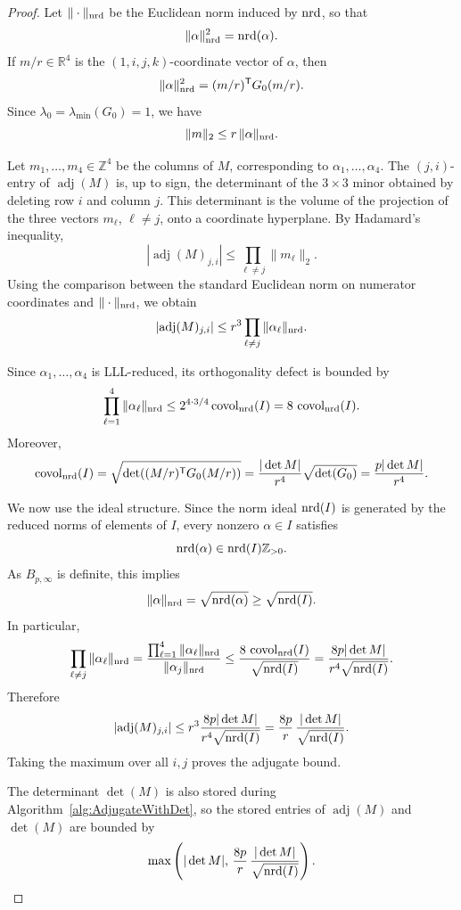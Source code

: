 \begin{proof}
Let \(\|\cdot\|_{\mathrm{nrd}}\) be the Euclidean norm induced by \(\mathrm{nrd}\), so that
\[
  \|\alpha\|_{\mathrm{nrd}}^2=\mathrm{nrd}(\alpha).
\]
If \(m/r\in\mathbb R^4\) is the \((1,i,j,k)\)-coordinate vector of \(\alpha\), then
\[
  \|\alpha\|_{\mathrm{nrd}}^2
  =
  (m/r)^{\mathsf T}G_0(m/r).
\]
Since \(\lambda_0=\lambda_{\min}(G_0)=1\), we have
\[
  \|m\|_2
  \le
  r\,\|\alpha\|_{\mathrm{nrd}}.
\]

Let \(m_1,\ldots,m_4\in\mathbb Z^4\) be the columns of \(M\), corresponding to
\(\alpha_1,\ldots,\alpha_4\).  The \((j,i)\)-entry of
\(\operatorname{adj}(M)\) is, up to sign, the determinant of the \(3\times 3\)
minor obtained by deleting row \(i\) and column \(j\).  This determinant is the
volume of the projection of the three vectors \(m_\ell\), \(\ell\neq j\), onto a
coordinate hyperplane.  By Hadamard's inequality,
\[
  \left|\operatorname{adj}(M)_{j,i}\right|
  \le
  \prod_{\ell\neq j}\|m_\ell\|_2 .
\]
Using the comparison between the standard Euclidean norm on numerator
coordinates and \(\|\cdot\|_{\mathrm{nrd}}\), we obtain
\[
  \left|\operatorname{adj}(M)_{j,i}\right|
  \le
  r^3
  \prod_{\ell\neq j}\|\alpha_\ell\|_{\mathrm{nrd}}.
\]

Since \(\alpha_1,\ldots,\alpha_4\) is LLL-reduced, its orthogonality
defect is bounded by
\[
  \prod_{\ell=1}^4 \|\alpha_\ell\|_{\mathrm{nrd}}
  \le
  2^{4\cdot 3/4}\operatorname{covol}_{\mathrm{nrd}}(I)
  =
  8\,\operatorname{covol}_{\mathrm{nrd}}(I).
\]
Moreover,
\[
  \operatorname{covol}_{\mathrm{nrd}}(I)
  =
  \sqrt{\det\!\left((M/r)^{\mathsf T}G_0(M/r)\right)}
  =
  \frac{|\det M|}{r^4}\sqrt{\det(G_0)}
  =
  \frac{p|\det M|}{r^4}.
\]

We now use the ideal structure.  Since the norm ideal \(\mathrm{nrd}(I)\) is generated by
the reduced norms of elements of \(I\), every nonzero \(\alpha\in I\) satisfies
\[
  \mathrm{nrd}(\alpha)\in \mathrm{nrd}(I)\mathbb Z_{>0}.
\]
As \(B_{p,\infty}\) is definite, this implies
\[
  \|\alpha\|_{\mathrm{nrd}}
  =
  \sqrt{\mathrm{nrd}(\alpha)}
  \ge
  \sqrt{\mathrm{nrd}(I)}.
\]
In particular,
\[
  \prod_{\ell\neq j}\|\alpha_\ell\|_{\mathrm{nrd}}
  =
  \frac{\prod_{\ell=1}^4\|\alpha_\ell\|_{\mathrm{nrd}}}
       {\|\alpha_j\|_{\mathrm{nrd}}}
  \le
  \frac{8\,\operatorname{covol}_{\mathrm{nrd}}(I)}{\sqrt{\mathrm{nrd}(I)}}
  =
  \frac{8p|\det M|}{r^4\sqrt{\mathrm{nrd}(I)}}.
\]
Therefore
\[
  \left|\operatorname{adj}(M)_{j,i}\right|
  \le
  r^3
  \frac{8p|\det M|}{r^4\sqrt{\mathrm{nrd}(I)}}
  =
  \frac{8p}{r}\,
  \frac{|\det M|}{\sqrt{\mathrm{nrd}(I)}}.
\]
Taking the maximum over all \(i,j\) proves the adjugate bound.

The determinant \(\det(M)\) is also stored during
Algorithm~\ref{alg:AdjugateWithDet}, so the stored entries of
\(\operatorname{adj}(M)\) and \(\det(M)\) are bounded by
\[
  \max\left(
    |\det M|,\,
    \frac{8p}{r}\,\frac{|\det M|}{\sqrt{\mathrm{nrd}(I)}}
  \right).
\]
\end{proof}

